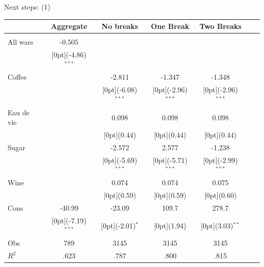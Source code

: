 \documentclass[11pt]{beamer}
\begin{document}
\begin{frame}{Next steps: (1)}
\begin{tabular*}{\textwidth}{@{\extracolsep{\fill}}lcccccc}						
	& \multicolumn{1}{c}{Aggregate} &	\multicolumn{1}{c}{No breaks} &	\multicolumn{1}{c}{One Break} & \multicolumn{1}{c}{Two Breaks} & \\
\hline					
\hline \\		
All wars &	-0.505 &	 & & & & \\
&	\raisebox{.7ex}[0pt]{\scriptsize (-4.86)$^{***}$} 	& &	& &	& \\				
Coffee &	 & -2.811 & -1.347 &	-1.348  &\\
& &	\raisebox{.7ex}[0pt]{\scriptsize (-6.08)$^{***}$} &	\raisebox{.7ex}[0pt]{\scriptsize (-2.96)$^{***}$} &	\raisebox{.7ex}[0pt]{\scriptsize (-2.96)$^{***}$} &\\
Eau de vie  & &	0.098 &0.098 &	0.098  &\\
& &	\raisebox{.7ex}[0pt]{\scriptsize (0.44)} &	\raisebox{.7ex}[0pt]{\scriptsize (0.44)} &	\raisebox{.7ex}[0pt]{\scriptsize (0.44)} \\
Sugar	& &	-2.572 &2.577 &	-1.238  \\
& &	\raisebox{.7ex}[0pt]{\scriptsize (-5.69)$^{***}$} &	\raisebox{.7ex}[0pt]{\scriptsize (-5.71)$^{***}$} &	\raisebox{.7ex}[0pt]{\scriptsize (-2.99)$^{***}$} \\
Wine&	 &	0.074 & 0.074 &	0.075 \\
& &	\raisebox{.7ex}[0pt]{\scriptsize (0.59)} &	\raisebox{.7ex}[0pt]{\scriptsize (0.59)} &	\raisebox{.7ex}[0pt]{\scriptsize (0.60)} \\
Cons &	-40.99 &	-23.09 &	109.7  &	278.7 \\
&	\raisebox{.7ex}[0pt]{\scriptsize (-7.19)$^{***}$} &	\raisebox{.7ex}[0pt]{\scriptsize (-2.01)$^{*}$} &	\raisebox{.7ex}[0pt]{\scriptsize (1.94)} &	\raisebox{.7ex}[0pt]{\scriptsize (3.03)$^{**}$} \\
\hline 
Obs &	789 &	3145 &	3145  & 3145 \\
$ R^2$ &	.623 &	.787 &	.800  & .815 \\

\hline\hline						
\end{tabular*}%
\end{frame}
\end{document}

